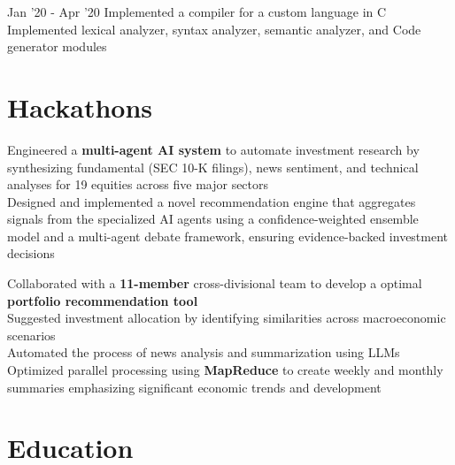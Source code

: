 \documentclass[a4paper]{Resume}
\begin{document}
\sectionsep{}

 {Jan '20 - Apr '20}
\pt Implemented a compiler for a custom language in C \\
\pt Implemented lexical analyzer, syntax analyzer, semantic analyzer, and Code generator modules \\

\sectionsep

\section{Hackathons}
\hrulefill

\pt Engineered a \textbf{multi-agent AI system} to automate investment research by synthesizing fundamental (SEC 10-K filings), news sentiment, and technical analyses for 19 equities across five major sectors \\
\pt Designed and implemented a novel recommendation engine that aggregates signals from the specialized AI agents using a confidence-weighted ensemble model and a multi-agent debate framework, ensuring evidence-backed investment decisions \\

\sectionsep{}

\pt Collaborated with a \textbf{11-member} cross-divisional team to develop a optimal \textbf{portfolio recommendation tool} \\
\pt Suggested investment allocation by identifying similarities across macroeconomic scenarios \\
\pt Automated the process of news analysis and summarization using LLMs \\
\pt Optimized parallel processing using \textbf{MapReduce} to create weekly and monthly summaries emphasizing significant economic trends and development \\

\sectionsep

\vspace{-6pt}

\section{Education}
\hrulefill
\end{document}
